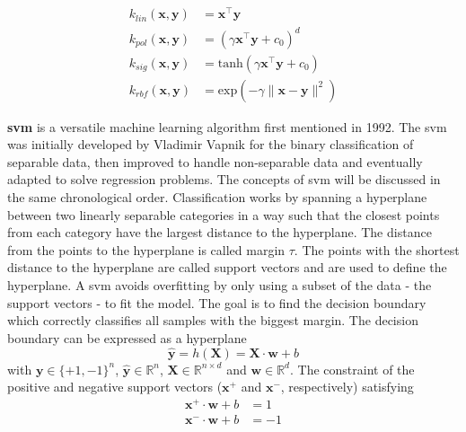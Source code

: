 \begin{align}
    \label{eq:lin-kernel}
    k_{lin}(\mathbf{x},\mathbf{y}) &= \mathbf{x}^{\top} \mathbf{y} \\
    \label{eq:pol-kernel}
    k_{pol}(\mathbf{x}, \mathbf{y}) &= (\gamma \mathbf{x}^{\top} \mathbf{y} + c_0)^d \\
    \label{eq:sig-kernel}
    k_{sig}(\mathbf{x}, \mathbf{y}) &= \text{tanh}(\gamma \mathbf{x}^{\top} \mathbf{y} + c_0) \\
    \label{eq:rbf-kernel}
    k_{rbf}(\mathbf{x}, \mathbf{y}) &= \text{exp}(- \gamma \| \mathbf{x} -  \mathbf{y} \|^2) 
\end{align}

\textbf{\Gls{svm}} is a versatile machine learning algorithm first mentioned in 1992\cite{boser1992training}. 
%
The \gls{svm} was initially developed by Vladimir Vapnik for the binary classification of separable data, then improved to handle non-separable data\cite{cortes1995support} and eventually adapted to solve regression problems\cite{drucker1996support}.
The concepts of \gls{svm} will be discussed in the same chronological order. 
%
Classification works by spanning a hyperplane between two linearly separable categories in a way such that the closest points from each category have the largest distance to the hyperplane. 
The distance from the points to the hyperplane is called margin $\tau$.
The points with the shortest distance to the hyperplane are called support vectors and are used to define the hyperplane.
A \gls{svm} avoids overfitting by only using a subset of the data - the support vectors - to fit the model. 
The goal is to find the decision boundary which correctly classifies all samples with the biggest margin. 
%
The decision boundary can be expressed as a hyperplane
\begin{equation}
	\hat{\mathbf{y}} = h(\mathbf{X}) = \mathbf{X} \cdot \mathbf{w} + b
\end{equation}
with 
$\mathbf{y} \in \lbrace +1, -1 \rbrace^n$, 
$\hat{\mathbf{y}} \in \mathbb{R}^n$,
$\mathbf{X} \in \mathbb{R}^{n \times d}$ and
$\mathbf{w} \in \mathbb{R}^d$.
The constraint of the positive and negative support vectors ($\mathbf{x}^+$ and $\mathbf{x}^-$, respectively) satisfying
\begin{align}
	\mathbf{x}^+ \cdot \mathbf{w} + b &= 1 \\
	\mathbf{x}^- \cdot \mathbf{w} + b &= -1 
\end{align}
